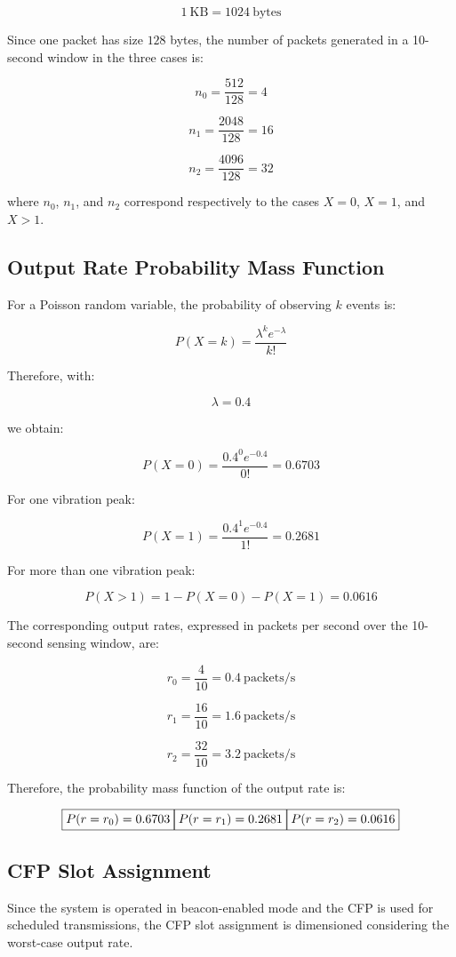 \documentclass[a4paper,12pt]{article}
\begin{document}
\[
1 \ \text{KB} = 1024 \ \text{bytes}
\]


Since one packet has size \(128\) bytes, the number of packets generated in a 10-second window in the three cases is:

\[
n_0 = \frac{512}{128} = 4
\]

\[
n_1 = \frac{2048}{128} = 16
\]

\[
n_2 = \frac{4096}{128} = 32
\]

where \(n_0\), \(n_1\), and \(n_2\) correspond respectively to the cases \(X=0\), \(X=1\), and \(X>1\).

\subsection{Output Rate Probability Mass Function}

For a Poisson random variable, the probability of observing \(k\) events is:

\[
P(X=k)=\frac{\lambda^k e^{-\lambda}}{k!}
\]

Therefore, with:

\[
\lambda = 0.4
\]

we obtain:

\[
P(X=0)=\frac{0.4^0 e^{-0.4}}{0!}=0.6703
\]

For one vibration peak:

\[
P(X=1)=\frac{0.4^1 e^{-0.4}}{1!}
=0.2681\]

For more than one vibration peak:

\[
P(X>1)=1-P(X=0)-P(X=1)=0.0616
\]

The corresponding output rates, expressed in packets per second over the 10-second sensing window, are:

\[
r_0 = \frac{4}{10} = 0.4 \ \text{packets/s}
\]

\[
r_1 = \frac{16}{10} = 1.6 \ \text{packets/s}
\]

\[
r_2 = \frac{32}{10} = 3.2 \ \text{packets/s}
\]

Therefore, the probability mass function of the output rate is:

\[
\boxed{P(r=r_0)=0.6703}\\
\boxed{P(r=r_1)=0.2681}\\
\boxed{P(r=r_2)=0.0616}
\]

\subsection{CFP Slot Assignment}

Since the system is operated in beacon-enabled mode and the CFP is used for scheduled transmissions, the CFP slot assignment is dimensioned considering the worst-case output rate.
\end{document}
